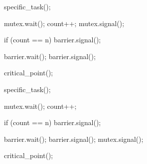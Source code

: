 \documentclass[varwidth=28em,crop]{standalone}
\begin{document}
\begin{minipage}{.46\linewidth}
\vspace{1em}
\begin{ccode}
specific_task();

mutex.wait();
   count++;
mutex.signal();

if (count == n)
   barrier.signal();

barrier.wait();
barrier.signal();

critical_point();      
\end{ccode}
\end{minipage}\qquad
\begin{minipage}{.45\linewidth}
\vspace{1em}
\begin{ccode}
specific_task();

mutex.wait();
   count++;

   if (count == n)
      barrier.signal();
   
   barrier.wait();
   barrier.signal();
mutex.signal();

critical_point();      
\end{ccode} 
\end{minipage}
\end{document}

